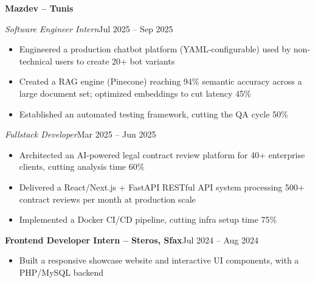\documentclass[10pt,a4paper]{article}
\newcommand{\entry}[2]{\vspace{1pt}\noindent\textbf{#1}\hfill{\color{muted}#2}\par}
\newcommand{\subentry}[2]{\noindent\textit{#1}\hfill{\color{muted}#2}\par}
\begin{document}
\entry{Mazdev -- Tunis}{}
\subentry{Software Engineer Intern}{Jul 2025 -- Sep 2025}
\begin{itemize}
  \item Engineered a production chatbot platform (YAML-configurable) used by non-technical users to create 20+ bot variants
  \item Created a RAG engine (Pinecone) reaching 94\% semantic accuracy across a large document set; optimized embeddings to cut latency 45\%
  \item Established an automated testing framework, cutting the QA cycle 50\%
\end{itemize}
\subentry{Fullstack Developer}{Mar 2025 -- Jun 2025}
\begin{itemize}
  \item Architected an AI-powered legal contract review platform for 40+ enterprise clients, cutting analysis time 60\%
  \item Delivered a React/Next.js + FastAPI RESTful API system processing 500+ contract reviews per month at production scale
  \item Implemented a Docker CI/CD pipeline, cutting infra setup time 75\%
\end{itemize}

\entry{Frontend Developer Intern -- Steros, Sfax}{Jul 2024 -- Aug 2024}
\begin{itemize}
  \item Built a responsive showcase website and interactive UI components, with a PHP/MySQL backend
\end{itemize}
\end{document}
